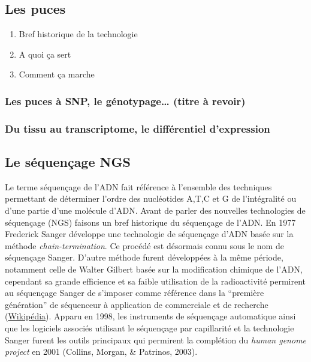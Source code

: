 \documentclass[12pt,twoside]{reedthesis}
\providecommand{\tightlist}{%
  \setlength{\itemsep}{0pt}\setlength{\parskip}{0pt}}
\theoremstyle{definition}
\theoremstyle{definition}
\theoremstyle{remark}
\begin{document}
  \subsection{Les puces}\label{les-puces}
  
  \begin{enumerate}
  \def\labelenumi{\arabic{enumi}.}
  \tightlist
  \item
    Bref historique de la technologie\\
  \item
    A quoi ça sert
  \item
    Comment ça marche
  \end{enumerate}
  
  \subsubsection{Les puces à SNP, le génotypage\ldots{} (titre à
  revoir)}\label{les-puces-a-snp-le-genotypage-titre-a-revoir}
  
  \subsubsection{Du tissu au transcriptome, le différentiel
  d'expression}\label{du-tissu-au-transcriptome-le-differentiel-dexpression}
  
  \subsection{Le séquençage NGS}\label{le-sequencage-ngs}
  
  Le terme séquençage de l'ADN fait référence à l'ensemble des techniques
  permettant de déterminer l'ordre des nucléotides A,T,C et G de
  l'intégralité ou d'une partie d'une molécule d'ADN. Avant de parler des
  nouvelles technologies de séquençage (NGS) faisons un bref historique du
  séquençage de l'ADN. En 1977 Frederick Sanger développe une technologie
  de séquençage d'ADN basée sur la méthode \emph{chain-termination}. Ce
  procédé est désormais connu sous le nom de séquençage Sanger. D'autre
  méthode furent développées à la même période, notamment celle de Walter
  Gilbert basée sur la modification chimique de l'ADN, cependant sa grande
  efficience et sa faible utilisation de la radioactivité permirent au
  séquençage Sanger de s'imposer comme référence dans la ``première
  génération'' de séquenceur à application de commerciale et de recherche
  (\href{http://en.wikipedia.org/wiki/DNA_sequencing}{Wikipédia}). Apparu
  en 1998, les instruments de séquençage automatique ainsi que les
  logiciels associés utilisant le séquençage par capillarité et la
  technologie Sanger furent les outils principaux qui permirent la
  complétion du \emph{human genome project} en 2001 (Collins, Morgan, \&
  Patrinos, 2003).
  
\end{document}
